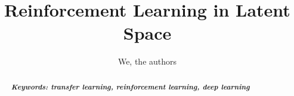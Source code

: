 \documentclass[11pt]{article}
\title{Reinforcement Learning in Latent Space}
\author{We, the authors}
\begin{document}
\maketitle
\begin{abstract}

\lipsum[1]

{{\it \bf Keywords: transfer learning, reinforcement learning, deep learning}}
\end{abstract}
 



%



{\tiny\printbibliography}

\clearpage
\raggedbottom
\appendix
\begin{appendix}
\end{appendix}
\end{document}
